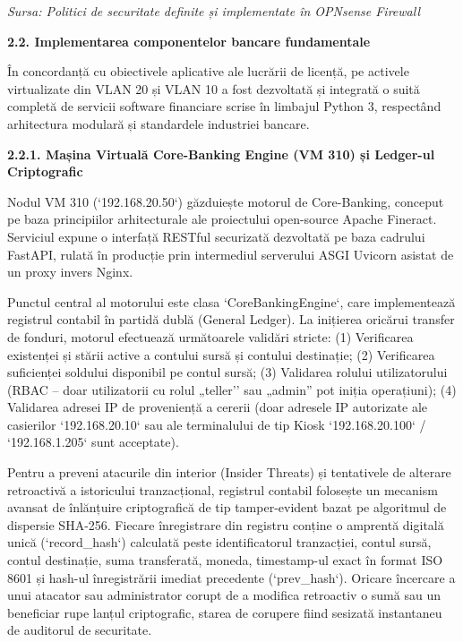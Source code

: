 \documentclass[
]{article}
\begin{document}
\emph{Sursa: Politici de securitate definite și implementate în OPNsense
Firewall}

\textbf{2.2. Implementarea componentelor bancare fundamentale}

În concordanță cu obiectivele aplicative ale lucrării de licență, pe
activele virtualizate din VLAN 20 și VLAN 10 a fost dezvoltată și
integrată o suită completă de servicii software financiare scrise în
limbajul Python 3, respectând arhitectura modulară și standardele
industriei bancare.

\textbf{2.2.1. Mașina Virtuală Core-Banking Engine (VM 310) și Ledger-ul
Criptografic}

Nodul VM 310 (`192.168.20.50`) găzduiește motorul de Core-Banking,
conceput pe baza principiilor arhitecturale ale proiectului open-source
Apache Fineract. Serviciul expune o interfață RESTful securizată
dezvoltată pe baza cadrului FastAPI, rulată în producție prin
intermediul serverului ASGI Uvicorn asistat de un proxy invers Nginx.

Punctul central al motorului este clasa `CoreBankingEngine`, care
implementează registrul contabil în partidă dublă (General Ledger). La
inițierea oricărui transfer de fonduri, motorul efectuează următoarele
validări stricte: (1) Verificarea existenței și stării active a contului
sursă și contului destinație; (2) Verificarea suficienței soldului
disponibil pe contul sursă; (3) Validarea rolului utilizatorului (RBAC
-- doar utilizatorii cu rolul „teller'' sau „admin'' pot iniția
operațiuni); (4) Validarea adresei IP de proveniență a cererii (doar
adresele IP autorizate ale casierilor `192.168.20.10` sau ale
terminalului de tip Kiosk `192.168.20.100` / `192.168.1.205` sunt
acceptate).

Pentru a preveni atacurile din interior (Insider Threats) și tentativele
de alterare retroactivă a istoricului tranzacțional, registrul contabil
folosește un mecanism avansat de înlănțuire criptografică de tip
tamper-evident bazat pe algoritmul de dispersie SHA-256. Fiecare
înregistrare din registru conține o amprentă digitală unică
(`record\_hash`) calculată peste identificatorul tranzacției, contul
sursă, contul destinație, suma transferată, moneda, timestamp-ul exact
în format ISO 8601 și hash-ul înregistrării imediat precedente
(`prev\_hash`). Oricare încercare a unui atacator sau administrator
corupt de a modifica retroactiv o sumă sau un beneficiar rupe lanțul
criptografic, starea de corupere fiind sesizată instantaneu de auditorul
de securitate.
\end{document}

